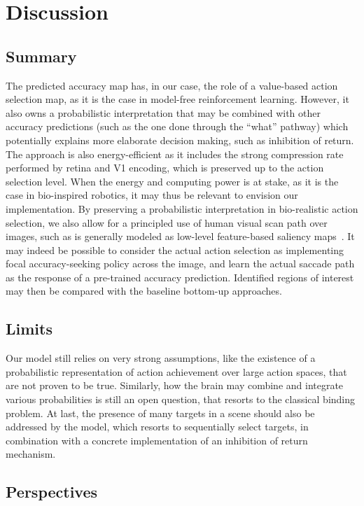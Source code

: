 \section{Discussion}
\label{sec:discussion}
\ICANN
\else

\subsection{Summary}
\fi
The predicted accuracy map has, in our case, the role of a value-based action selection map, as it is the case in model-free reinforcement learning. However, it also owns a probabilistic interpretation that may be combined with other accuracy predictions (such as the one done through the ``what'' pathway) which potentially explains more elaborate decision making, such as inhibition of return. The approach is also energy-efficient as it includes the strong compression rate performed by retina and V1 encoding, which is preserved up to the action selection level. When the energy and computing power is at stake, as it is the case in bio-inspired robotics, it may thus be relevant to envision our implementation. By preserving a probabilistic interpretation in bio-realistic action selection, we also allow for a principled use of human visual scan path over images, such as is generally modeled as low-level feature-based saliency maps~\citep{Itti01}. It may indeed be possible to consider the actual action selection as implementing focal accuracy-seeking policy across the image, and learn the actual saccade path as the response of a pre-trained accuracy prediction. Identified regions of interest may then be compared with the baseline bottom-up approaches.

\ICANN
\else
\subsection{Limits}
\fi


Our model still relies on very strong assumptions, like the existence of a probabilistic representation of action achievement over large action spaces, that are not proven to be true. Similarly, how the brain may combine and integrate various probabilities is still an open question, that resorts to the classical binding problem. %
At last, the presence of many targets in a scene should also be addressed by the model, which resorts to sequentially select targets, in combination with a concrete implementation of an inhibition of return mechanism.
\ICANN
\else


\subsection{Perspectives}
\fi